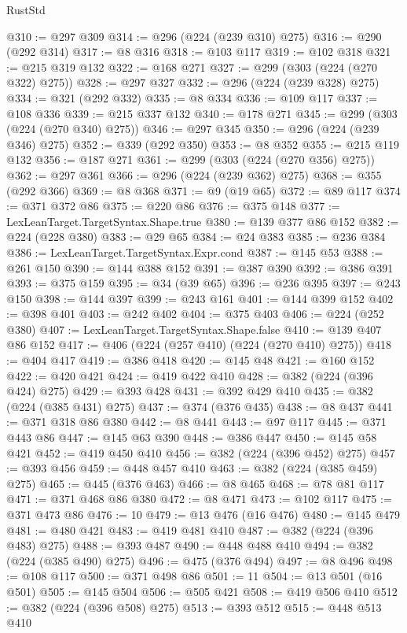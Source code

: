\begin{lexlean}{RustStd}
\begin{coremodule}
@310 := @297 @309
@314 := @296 (@224 (@239 @310) @275)
@316 := @290 (@292 @314)
@317 := @8 @316
@318 := @103 @117
@319 := @102 @318
@321 := @215 @319 @132
@322 := @168 @271
@327 := @299 (@303 (@224 (@270 @322) @275))
@328 := @297 @327
@332 := @296 (@224 (@239 @328) @275)
@334 := @321 (@292 @332)
@335 := @8 @334
@336 := @109 @117
@337 := @108 @336
@339 := @215 @337 @132
@340 := @178 @271
@345 := @299 (@303 (@224 (@270 @340) @275))
@346 := @297 @345
@350 := @296 (@224 (@239 @346) @275)
@352 := @339 (@292 @350)
@353 := @8 @352
@355 := @215 @119 @132
@356 := @187 @271
@361 := @299 (@303 (@224 (@270 @356) @275))
@362 := @297 @361
@366 := @296 (@224 (@239 @362) @275)
@368 := @355 (@292 @366)
@369 := @8 @368
@371 := @9 (@19 @65)
@372 := @89 @117
@374 := @371 @372 @86
@375 := @220 @86
@376 := @375 @148
@377 := LexLeanTarget.TargetSyntax.Shape.true
@380 := @139 @377 @86 @152
@382 := @224 (@228 @380)
@383 := @29 @65
@384 := @24 @383
@385 := @236 @384
@386 := LexLeanTarget.TargetSyntax.Expr.cond
@387 := @145 @53
@388 := @261 @150
@390 := @144 @388 @152
@391 := @387 @390
@392 := @386 @391
@393 := @375 @159
@395 := @34 (@39 @65)
@396 := @236 @395
@397 := @243 @150
@398 := @144 @397
@399 := @243 @161
@401 := @144 @399 @152
@402 := @398 @401
@403 := @242 @402
@404 := @375 @403
@406 := @224 (@252 @380)
@407 := LexLeanTarget.TargetSyntax.Shape.false
@410 := @139 @407 @86 @152
@417 := @406 (@224 (@257 @410) (@224 (@270 @410) @275))
@418 := @404 @417
@419 := @386 @418
@420 := @145 @48
@421 := @160 @152
@422 := @420 @421
@424 := @419 @422 @410
@428 := @382 (@224 (@396 @424) @275)
@429 := @393 @428
@431 := @392 @429 @410
@435 := @382 (@224 (@385 @431) @275)
@437 := @374 (@376 @435)
@438 := @8 @437
@441 := @371 @318 @86 @380
@442 := @8 @441
@443 := @97 @117
@445 := @371 @443 @86
@447 := @145 @63 @390
@448 := @386 @447
@450 := @145 @58 @421
@452 := @419 @450 @410
@456 := @382 (@224 (@396 @452) @275)
@457 := @393 @456
@459 := @448 @457 @410
@463 := @382 (@224 (@385 @459) @275)
@465 := @445 (@376 @463)
@466 := @8 @465
@468 := @78 @81 @117
@471 := @371 @468 @86 @380
@472 := @8 @471
@473 := @102 @117
@475 := @371 @473 @86
@476 := 10
@479 := @13 @476 (@16 @476)
@480 := @145 @479
@481 := @480 @421
@483 := @419 @481 @410
@487 := @382 (@224 (@396 @483) @275)
@488 := @393 @487
@490 := @448 @488 @410
@494 := @382 (@224 (@385 @490) @275)
@496 := @475 (@376 @494)
@497 := @8 @496
@498 := @108 @117
@500 := @371 @498 @86
@501 := 11
@504 := @13 @501 (@16 @501)
@505 := @145 @504
@506 := @505 @421
@508 := @419 @506 @410
@512 := @382 (@224 (@396 @508) @275)
@513 := @393 @512
@515 := @448 @513 @410

\end{coremodule}
\end{lexlean}
